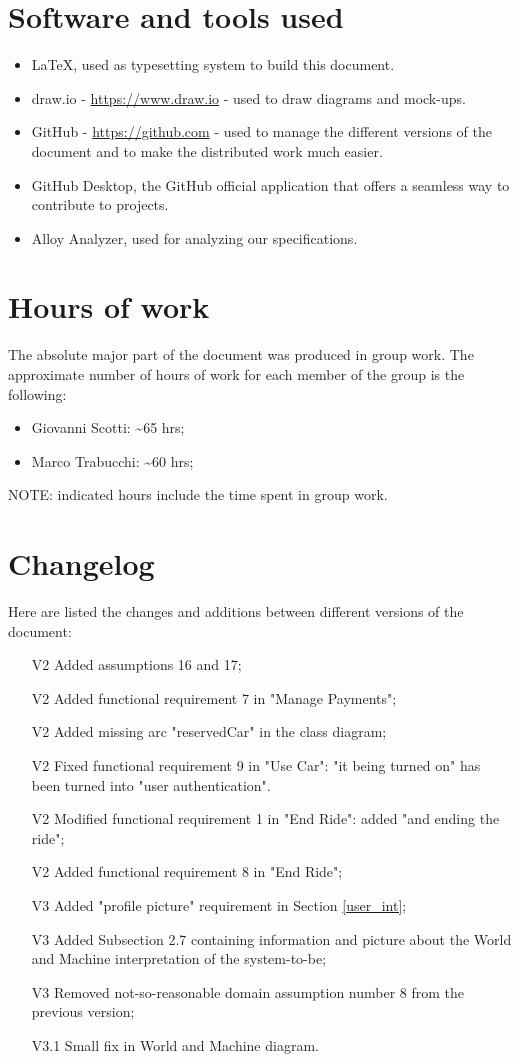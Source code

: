 \section{Software and tools used}
\begin{itemize}
\item \LaTeX, used as typesetting system to build this document.
\item draw.io - \url{https://www.draw.io} - used to draw diagrams and mock-ups.
\item GitHub - \url{https://github.com} - used to manage the different versions of the document and to make the distributed work much easier.
\item GitHub Desktop, the GitHub official application that offers a seamless way to contribute to projects.
\item Alloy Analyzer, used for analyzing our specifications.
\end{itemize}
\section{Hours of work}
The absolute major part of the document was produced in group work. The approximate number of hours of work for each member of the group is the following:

\begin{itemize}
\item Giovanni Scotti: \textasciitilde 65 hrs;
\item Marco Trabucchi: \textasciitilde 60 hrs;
\end{itemize}

NOTE: indicated hours include the time spent in group work.

\section{Changelog}
Here are listed the changes and additions between different versions of the document:
\begin{itemize}
\item[V2] Added assumptions 16 and 17;
\item[V2] Added functional requirement 7 in "Manage Payments";
\item[V2] Added missing arc "reservedCar" in the class diagram;
\item[V2] Fixed functional requirement 9 in "Use Car": "it being turned on" has been turned into "user authentication".
\item[V2] Modified functional requirement 1 in "End Ride": added "and ending the ride";
\item[V2] Added functional requirement 8 in "End Ride";
\item[V3] Added "profile picture" requirement in Section \ref{user_int};
\item[V3] Added Subsection 2.7 containing information and picture about the World and Machine interpretation of the system-to-be;
\item[V3] Removed not-so-reasonable domain assumption number 8 from the previous version;
\item[V3.1] Small fix in World and Machine diagram.
\end{itemize}
